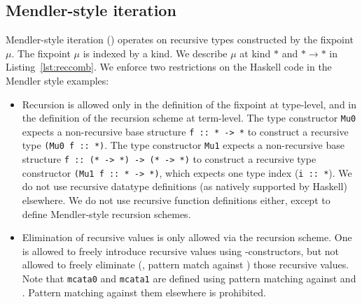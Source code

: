 \subsection{Mendler-style iteration}
\label{sec:mendler:it}
Mendler-style iteration (\MIt{}) operates on recursive types constructed by
the fixpoint $\mu$. The fixpoint $\mu$ is indexed by a kind. We describe
$\mu$ at kind $*$ and $*\to*$ in Listing~\ref{lst:reccomb}.
We enforce two restrictions on the Haskell code in the Mendler style examples:
\begin{itemize}
\item Recursion is allowed only in the definition of the fixpoint at type-level,
and in the definition of the recursion scheme at term-level.
The type constructor \lstinline{Mu0} expects a non-recursive base structure
\lstinline{f :: * -> *} to construct a recursive type \lstinline{(Mu0 f :: *)}.
The type constructor \lstinline{Mu1} expects a non-recursive base structure
\lstinline{f :: (* -> *) -> (* -> *)} to construct a recursive type constructor
\lstinline{(Mu1 f :: * -> *)}, which expects one type index
(\lstinline{i :: *}). We do not use recursive datatype definitions (as
natively supported by Haskell) elsewhere. We do not use recursive function
definitions either, except to define Mendler-style recursion schemes.

\item Elimination of recursive values is only allowed via the recursion scheme.
One is allowed to freely introduce recursive values using \In{}-constructors,
but not allowed to freely eliminate (\ie, pattern match against \In{})
those recursive values. Note that \lstinline{mcata0} and \lstinline{mcata1}
are defined using pattern matching against \In{*} and \In{*\to*}.
Pattern matching against them elsewhere is prohibited.
\end{itemize}


